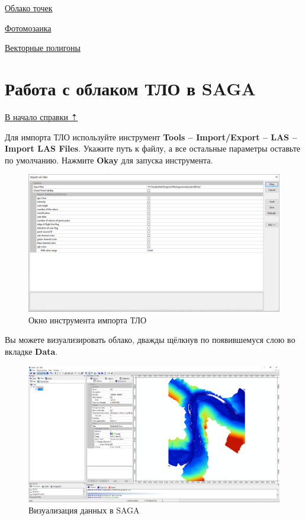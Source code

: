 \documentclass[
  12pt,
]{book}
\begin{document}
\href{https://disk.yandex.ru/d/CKfoC4XVkCTuIg}{Облако точек}

\href{https://disk.yandex.ru/d/ku7cj4tUNOKV3w}{Фотомозаика}

\href{https://disk.yandex.ru/d/MruskWn_oupM0w}{Векторные полигоны}

\hypertarget{las-Extract}{%
\section{Работа с облаком ТЛО в SAGA}\label{las-Extract}}

\protect\hyperlink{las}{В начало справки ⇡}

Для импорта ТЛО используйте инструмент \textbf{Tools -- Import/Export -- LAS -- Import LAS Files}. Укажите путь к файлу, а все остальные параметры оставьте по умолчанию. Нажмите \textbf{Okay} для запуска инструмента.

\begin{figure}
\centering
\includegraphics{images/Ref19/Import_LAS.png}
\caption{Окно инструмента импорта ТЛО}
\end{figure}

Вы можете визуализировать облако, дважды щёлкнув по появившемуся слою во вкладке \textbf{Data}.

\begin{figure}
\centering
\includegraphics{images/Ref19/Point_Cloud.png}
\caption{Визуализация данных в SAGA}
\end{figure}
\end{document}
